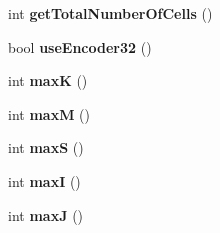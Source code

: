 \begin{DoxyCompactItemize}
\item 
int {\bfseries get\-Total\-Number\-Of\-Cells} ()\label{classdigisim_1_1RandomCellSelector_a47ae7440cce769364e34ec878aed147e}

\item 
bool {\bfseries use\-Encoder32} ()\label{classdigisim_1_1RandomCellSelector_acae9047a8c0477530a3f66ba7f9dc242}

\item 
int {\bfseries max\-K} ()\label{classdigisim_1_1RandomCellSelector_a24a9173fd46fc5a06f3b7bba113544c1}

\item 
int {\bfseries max\-M} ()\label{classdigisim_1_1RandomCellSelector_a2fe2b6f85fdaea0b31f32589118780aa}

\item 
int {\bfseries max\-S} ()\label{classdigisim_1_1RandomCellSelector_a2364c5617141b8f2413a686bd012d7c1}

\item 
int {\bfseries max\-I} ()\label{classdigisim_1_1RandomCellSelector_ad3bb62ee1f79f2a1097d0e170607c34c}

\item 
int {\bfseries max\-J} ()\label{classdigisim_1_1RandomCellSelector_a65b2022316841b74011dbcd04cd2410f}

\end{DoxyCompactItemize}
